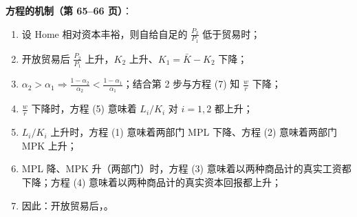 \textbf{方程的机制（第 65--66 页）}：
\begin{enumerate}
  \item 设 Home 相对资本丰裕，则自给自足的 $\frac{P_2}{P_1}$ 低于贸易时；
  \item 开放贸易后 $\frac{P_2}{P_1}$ 上升，$K_2$ 上升、$K_1 = \bar{K} - K_2$ 下降；
  \item $\alpha_2 > \alpha_1 \Rightarrow \frac{1-\alpha_2}{\alpha_2} < \frac{1-\alpha_1}{\alpha_1}$；结合第 2 步与方程 (7) 知 $\frac{w}{r}$ 下降；
  \item $\frac{w}{r}$ 下降时，方程 (5) 意味着 $L_i/K_i$ 对 $i = 1, 2$ 都上升；
  \item $L_i/K_i$ 上升时，方程 (1) 意味着两部门 MPL 下降、方程 (2) 意味着两部门 MPK 上升；
  \item MPL 降、MPK 升（两部门）时，方程 (3) 意味着以两种商品计的真实工资都下降；方程 (4) 意味着以两种商品计的真实资本回报都上升；
  \item 因此：开放贸易后，。
\end{enumerate}


